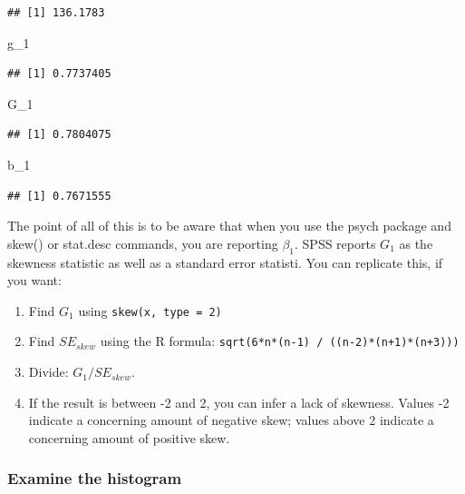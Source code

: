 \documentclass[
]{book}
\newenvironment{Shaded}{\begin{snugshade}}{\end{snugshade}}
\newcommand{\NormalTok}[1]{#1}
\begin{document}
\begin{verbatim}
## [1] 136.1783
\end{verbatim}

\begin{Shaded}
\begin{Highlighting}[]
\NormalTok{g\_1}
\end{Highlighting}
\end{Shaded}

\begin{verbatim}
## [1] 0.7737405
\end{verbatim}

\begin{Shaded}
\begin{Highlighting}[]
\NormalTok{G\_1}
\end{Highlighting}
\end{Shaded}

\begin{verbatim}
## [1] 0.7804075
\end{verbatim}

\begin{Shaded}
\begin{Highlighting}[]
\NormalTok{b\_1}
\end{Highlighting}
\end{Shaded}

\begin{verbatim}
## [1] 0.7671555
\end{verbatim}

The point of all of this is to be aware that when you use the psych package and skew() or stat.desc commands, you are reporting \(\beta_{1}\). SPSS reports \(G_{1}\) as the skewness statistic as well as a standard error statisti. You can replicate this, if you want:

\begin{enumerate}
\def\labelenumi{\arabic{enumi}.}
\item
  Find \(G_{1}\) using \texttt{skew(x,\ type\ =\ 2)}
\item
  Find \({SE_{skew}}\) using the R formula: \texttt{sqrt(6*n*(n-1)\ /\ ((n-2)*(n+1)*(n+3)))}
\item
  Divide: \(G_{1}/{SE_{skew}}\).
\item
  If the result is between -2 and 2, you can infer a lack of skewness. Values -2 indicate a concerning amount of negative skew; values above 2 indicate a concerning amount of positive skew.
\end{enumerate}

\hypertarget{examine-the-histogram}{%
\subsubsection{Examine the histogram}\label{examine-the-histogram}}
\end{document}
